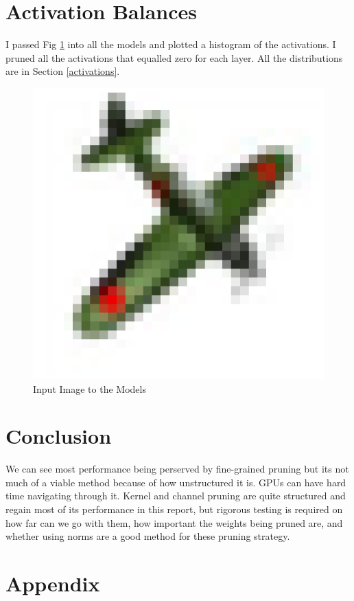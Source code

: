 \documentclass[12pt]{article}
\begin{document}
\section{Activation Balances}

I passed Fig \ref{fig:Input_Image} into all the models and plotted a histogram of the activations. I pruned all the activations that equalled zero for each layer. All the distributions are in Section \ref{activations}.

\begin{figure}[h]
  \centering
  \includegraphics[width=0.4\linewidth]{report_images/plane_input.png}
  \caption{\label{fig:Input_Image}Input Image to the Models}
\end{figure}

\section{Conclusion}
We can see most performance being perserved by fine-grained pruning but its not much of a viable method because of how unstructured it is. GPUs can have hard time navigating through it. Kernel and channel pruning are quite structured and regain most of its performance in this report, but rigorous testing is required on how far can we go with them, how important the weights being pruned are, and whether using norms are a good method for these pruning strategy.

\pagebreak
\section{Appendix} 
\end{document}
